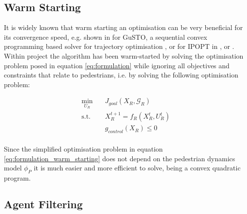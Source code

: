 \subsection{Warm Starting}
\label{text:approach/runtime/warm_starting}
It is widely known that warm starting an optimisation can be very beneficial for its convergence speed, e.g. shown in \cite{Banerjee2020} for GuSTO, a sequential convex programming based solver for trajectory optimisation \cite{Bonalli2019}, or for \ac{IPOPT} in \cite{Shahzad2010}, \cite{John2008} or \cite{Spielberge2019}.
\newline
Within project \project the algorithm has been warm-started by solving the optimisation problem posed in equation \ref{eq:formulation} while ignoring all objectives and constraints that relate to pedestrians, i.e. by solving the following optimisation problem: 

\begin{align}
\min_{U_R} \quad & J_{goal}(X_R, \mathcal{G}_R) \\
\textrm{s.t. } \quad & X_R^{t+1} = f_R(X_R^t, U_R^t) \\
& g_{control}(X_R) \leq 0 \\
\label{eq:formulation_warm_starting}
\end{align} 

Since the simplified optimisation problem in equation \ref{eq:formulation_warm_starting} does not depend on the pedestrian dynamics model $\phi_P$ it is much easier and more efficient to solve, being a convex quadratic program. 

\subsection{Agent Filtering}
\label{text:approach/runtime/filtering}

